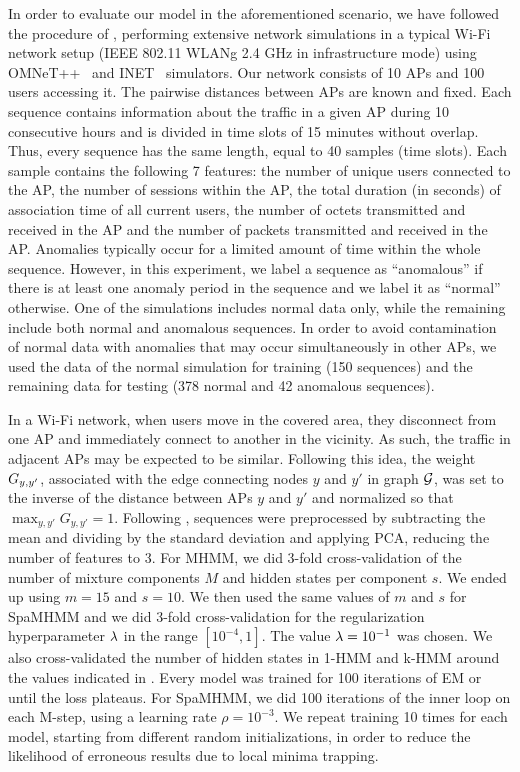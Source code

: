 In order to evaluate our model in the aforementioned scenario, we have followed the procedure of \citet{Anisa2017}, performing extensive network simulations in a typical Wi-Fi network setup (IEEE 802.11 WLANg 2.4 GHz in infrastructure mode) using OMNeT++~\cite{omnetpp} and INET~\cite{inet} simulators. Our network consists of 10 APs and 100 users accessing it. The pairwise distances between APs are known and fixed. Each sequence contains information about the traffic in a given AP during 10 consecutive hours and is divided in time slots of 15 minutes without overlap. Thus, every sequence has the same length, equal to 40 samples (time slots). Each sample contains the following 7 features: the number of unique users connected to the AP, the number of sessions within the AP, the total duration (in seconds) of association time of all current users, the number of octets transmitted and received in the AP and the number of packets transmitted and received in the AP. Anomalies typically occur for a limited amount of time within the whole sequence. However, in this experiment, we label a sequence as ``anomalous'' if there is at least one anomaly period in the sequence and we label it as ``normal'' otherwise. One of the simulations includes normal data only, while the remaining include both normal and anomalous sequences. In order to avoid contamination of normal data with anomalies that may occur simultaneously in other APs, we used the data of the normal simulation for training (150 sequences) and the remaining data for testing (378 normal and 42 anomalous sequences).

In a Wi-Fi network, when users move in the covered area, they disconnect from one AP and immediately connect to another in the vicinity. As such, the traffic in adjacent APs may be expected to be similar. Following this idea, the weight ${G}_{y,y'}$, associated with the edge connecting nodes $y$ and $y'$ in graph ${\mathcal{G}}$, was set to the inverse of the distance between APs $y$ and $y'$ and normalized so that $\max_{y,y'} G_{y,y'}=1$. Following \citet{Anisa2017}, sequences were preprocessed by subtracting the mean and dividing by the standard deviation and applying PCA, reducing the number of features to 3. For MHMM, we did 3-fold cross-validation of the number of mixture components $M$ and hidden states per component $s$. We ended up using $m=15$ and $s=10$. We then used the same values of $m$ and $s$ for SpaMHMM and we did 3-fold cross-validation for the regularization hyperparameter $\lambda$ in the range $[10^{-4}, 1]$. The value $\lambda=10^{-1}$ was chosen. We also cross-validated the number of hidden states in 1-HMM and k-HMM around the values indicated in . Every model was trained for 100 iterations of EM or until the loss plateaus. For SpaMHMM, we did 100 iterations of the inner loop on each M-step, using a learning rate $\rho=10^{-3}$. We repeat training 10 times for each model, starting from different random initializations, in order to reduce the likelihood of erroneous results due to local minima trapping.

